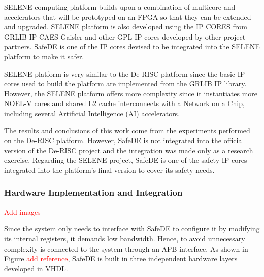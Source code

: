 SELENE computing platform builds upon a combination of multicore and accelerators that will be prototyped on an FPGA so that they can be extended and upgraded. SELENE platform is also developed using the IP CORES from GRLIB IP CAES Gaisler and other GPL IP cores developed by other project partners. SafeDE is one of the IP cores devised to be integrated into the SELENE platform to make it safer.

SELENE platform is very similar to the De-RISC platform since the basic IP cores used to build the platform are implemented from the GRLIB IP library. However, the SELENE platform offers more complexity since it instantiates more NOEL-V cores and shared L2 cache interconnects with a Network on a Chip, including several Artificial Intelligence (AI) accelerators.

The results and conclusions of this work come from the experiments performed on the De-RISC platform. However, SafeDE is not integrated into the official version of the De-RISC project and the integration was made only as a research exercise. Regarding the SELENE project, SafeDE is one of the safety IP cores integrated into the platform's final version to cover its safety needs.


\subsubsection{Hardware Implementation and Integration}
\textcolor{red}{Add images}

Since the system only needs to interface with SafeDE to configure it by modifying its internal registers, it demands low bandwidth. Hence, to avoid unnecessary complexity is connected to the system through an APB interface. As shown in Figure \textcolor{red}{add reference}, SafeDE is built in three independent hardware layers developed in VHDL. 


